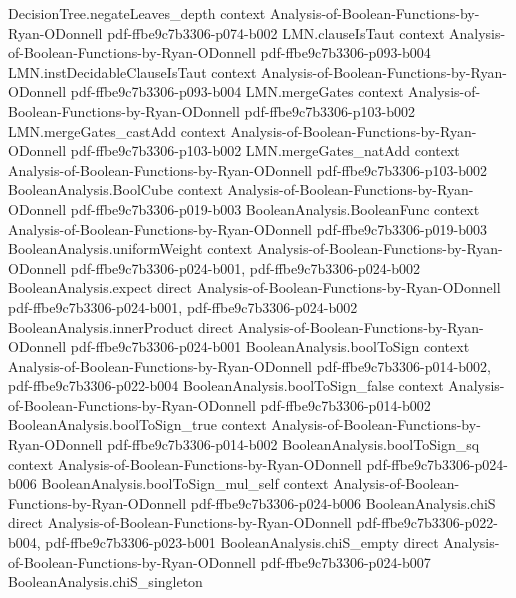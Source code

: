 \begin{lemma}
\proofstep
  {DecisionTree.negateLeaves_depth}
  {context}
  {Analysis-of-Boolean-Functions-by-Ryan-ODonnell}
  {pdf-ffbe9c7b3306-p074-b002}
\proofstep
  {LMN.clauseIsTaut}
  {context}
  {Analysis-of-Boolean-Functions-by-Ryan-ODonnell}
  {pdf-ffbe9c7b3306-p093-b004}
\proofstep
  {LMN.instDecidableClauseIsTaut}
  {context}
  {Analysis-of-Boolean-Functions-by-Ryan-ODonnell}
  {pdf-ffbe9c7b3306-p093-b004}
\proofstep
  {LMN.mergeGates}
  {context}
  {Analysis-of-Boolean-Functions-by-Ryan-ODonnell}
  {pdf-ffbe9c7b3306-p103-b002}
\proofstep
  {LMN.mergeGates_castAdd}
  {context}
  {Analysis-of-Boolean-Functions-by-Ryan-ODonnell}
  {pdf-ffbe9c7b3306-p103-b002}
\proofstep
  {LMN.mergeGates_natAdd}
  {context}
  {Analysis-of-Boolean-Functions-by-Ryan-ODonnell}
  {pdf-ffbe9c7b3306-p103-b002}
\proofstep
  {BooleanAnalysis.BoolCube}
  {context}
  {Analysis-of-Boolean-Functions-by-Ryan-ODonnell}
  {pdf-ffbe9c7b3306-p019-b003}
\proofstep
  {BooleanAnalysis.BooleanFunc}
  {context}
  {Analysis-of-Boolean-Functions-by-Ryan-ODonnell}
  {pdf-ffbe9c7b3306-p019-b003}
\proofstep
  {BooleanAnalysis.uniformWeight}
  {context}
  {Analysis-of-Boolean-Functions-by-Ryan-ODonnell}
  {pdf-ffbe9c7b3306-p024-b001,
    pdf-ffbe9c7b3306-p024-b002}
\proofstep
  {BooleanAnalysis.expect}
  {direct}
  {Analysis-of-Boolean-Functions-by-Ryan-ODonnell}
  {pdf-ffbe9c7b3306-p024-b001,
    pdf-ffbe9c7b3306-p024-b002}
\proofstep
  {BooleanAnalysis.innerProduct}
  {direct}
  {Analysis-of-Boolean-Functions-by-Ryan-ODonnell}
  {pdf-ffbe9c7b3306-p024-b001}
\proofstep
  {BooleanAnalysis.boolToSign}
  {context}
  {Analysis-of-Boolean-Functions-by-Ryan-ODonnell}
  {pdf-ffbe9c7b3306-p014-b002,
    pdf-ffbe9c7b3306-p022-b004}
\proofstep
  {BooleanAnalysis.boolToSign_false}
  {context}
  {Analysis-of-Boolean-Functions-by-Ryan-ODonnell}
  {pdf-ffbe9c7b3306-p014-b002}
\proofstep
  {BooleanAnalysis.boolToSign_true}
  {context}
  {Analysis-of-Boolean-Functions-by-Ryan-ODonnell}
  {pdf-ffbe9c7b3306-p014-b002}
\proofstep
  {BooleanAnalysis.boolToSign_sq}
  {context}
  {Analysis-of-Boolean-Functions-by-Ryan-ODonnell}
  {pdf-ffbe9c7b3306-p024-b006}
\proofstep
  {BooleanAnalysis.boolToSign_mul_self}
  {context}
  {Analysis-of-Boolean-Functions-by-Ryan-ODonnell}
  {pdf-ffbe9c7b3306-p024-b006}
\proofstep
  {BooleanAnalysis.chiS}
  {direct}
  {Analysis-of-Boolean-Functions-by-Ryan-ODonnell}
  {pdf-ffbe9c7b3306-p022-b004,
    pdf-ffbe9c7b3306-p023-b001}
\proofstep
  {BooleanAnalysis.chiS_empty}
  {direct}
  {Analysis-of-Boolean-Functions-by-Ryan-ODonnell}
  {pdf-ffbe9c7b3306-p024-b007}
\proofstep
  {BooleanAnalysis.chiS_singleton}

\end{lemma}
